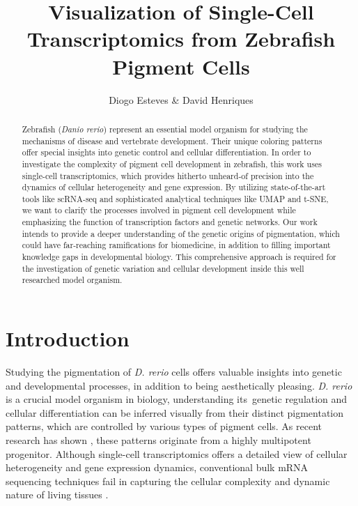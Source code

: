 \documentclass[runningheads]{llncs}
\begin{document}
\title{Visualization of Single-Cell Transcriptomics from Zebrafish Pigment Cells}

\author{Diogo Esteves \& David Henriques}


\maketitle

\begin{abstract}
Zebrafish (\textit{Danio rerio}) represent an essential model organism for studying the mechanisms of disease and vertebrate development. Their unique coloring patterns offer special insights into genetic control and cellular differentiation. In order to investigate the complexity of pigment cell development in zebrafish, this work uses single-cell transcriptomics, which provides hitherto unheard-of precision into the dynamics of cellular heterogeneity and gene expression. By utilizing state-of-the-art tools like scRNA-seq and sophisticated analytical techniques like UMAP and t-SNE, we want to clarify the processes involved in pigment cell development while emphasizing the function of transcription factors and genetic networks. Our work intends to provide a deeper understanding of the genetic origins of pigmentation, which could have far-reaching ramifications for biomedicine, in addition to filling important knowledge gaps in developmental biology. This comprehensive approach is required for the investigation of genetic variation and cellular development inside this well researched model organism.
\end{abstract}

\section{Introduction}
\lettrine[]{S}{}tudying the pigmentation of \textit{D. rerio} cells offers valuable insights into genetic and developmental processes, in addition to being aesthetically pleasing. \textit{D. rerio} is a crucial model organism in biology, understanding its genetic regulation and cellular differentiation can be inferred visually from their distinct pigmentation patterns, which are controlled by various types of pigment cells. As recent research has shown \cite{subkhankulova2023zebrafish}, these patterns originate from a highly multipotent progenitor. Although single-cell transcriptomics offers a detailed view of cellular heterogeneity and gene expression dynamics, conventional bulk mRNA sequencing techniques fail in capturing the cellular complexity and dynamic nature of living tissues \cite{nayak2021hitchhiker}.
\end{document}
